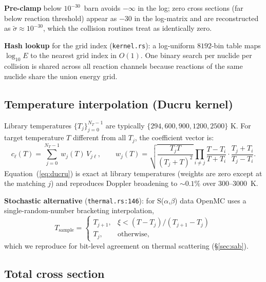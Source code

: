 \documentclass[11pt,a4paper]{article}
\begin{document}
\textbf{Pre-clamp} below $10^{-30}$~barn avoids $-\infty$ in the
log; zero cross sections (far below reaction threshold) appear as
$-30$ in the log-matrix and are reconstructed as
$\tilde\sigma \approx 10^{-30}$, which the collision routines
treat as identically zero.

\textbf{Hash lookup} for the grid index (\texttt{kernel.rs}): a
log-uniform $8192$-bin table maps $\log_{10} E$ to the nearest
grid index in $O(1)$. One binary search per nuclide per collision
is shared across all reaction channels because reactions of the
same nuclide share the union energy grid.

\subsection{Temperature interpolation (Ducru kernel)}
\label{sec:ducru}

Library temperatures $\{T_j\}_{j=0}^{N_T-1}$ are typically
$\{294, 600, 900, 1200, 2500\}$ K. For target temperature $T$
different from all $T_j$, the coefficient vector is:
\begin{equation}
c_\ell(T) = \sum_{j=0}^{N_T - 1} w_j(T)\, V_{j\ell},
\qquad
w_j(T) = \sqrt{\frac{T_j T}{(T_j + T)^2}}
\prod_{i \neq j}
\frac{T - T_i}{T + T_i} \cdot \frac{T_j + T_i}{T_j - T_i}.
\label{eq:ducru}
\end{equation}
Equation~(\ref{eq:ducru}) is exact at library temperatures
(weights are zero except at the matching $j$) and reproduces
Doppler broadening to $\sim\!0.1\%$ over $300$--$3000$~K.

\textbf{Stochastic alternative} (\texttt{thermal.rs:146}): for
S($\alpha$,$\beta$) data OpenMC uses a single-random-number
bracketing interpolation,
\begin{equation}
  T_\text{sample} =
  \begin{cases}
    T_{j+1}, & \xi < (T - T_j)/(T_{j+1} - T_j) \\
    T_j, & \text{otherwise},
  \end{cases}
\end{equation}
which we reproduce for bit-level agreement on thermal scattering
(\S\ref{sec:sab}).

\subsection{Total cross section}
\end{document}
